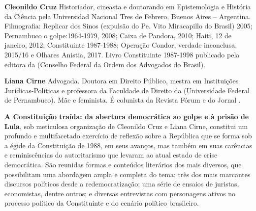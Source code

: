 \textbf{Cleonildo Cruz} Historiador, cineasta e doutorando em Epistemologia e História da Ciência pela Universidad Nacional Tres de Febrero, Buenos Aires – Argentina. Filmografia: Replicar dos Sinos (expulsão do Pe. Vito Miracapillo do Brasil) 2005; Pernambuco o golpe:1964-1979, 2008; Caixa de Pandora, 2010; Haiti, 12 de janeiro, 2012; Constituinte 1987-1988; Operação Condor, verdade inconclusa, 2015/16 e Olhares Anistia, 2017. Livro Constituinte 1987-1998 publicado pela editora da  (Conselho Federal da Ordem dos Advogados do Brasil).

\textbf{Liana Cirne} Advogada. Doutora em Direito Público, mestra em Instituições Jurídicas-Políticas e professora da Faculdade de Direito da  (Universidade Federal de Pernambuco). Mãe e feminista. É colunista da Revista Fórum e do Jornal . 

\textbf{A Constituição traída: da abertura democrática ao golpe e à prisão
de Lula}, sob meticulosa organização de Cleonildo Cruz e Liana Cirne, constitui
um profundo e multifacetado exercício de reflexão sobre a República que se forma
sob a égide da Constituição de 1988, em seus avanços, mas também em suas carências
e reminiscências do autoritarismo que levaram ao atual estado de crise democrática.
São reunidas formas e conteúdos literários dos mais diversos, que possibilitam
uma abordagem ampla e completa do tema: três dos mais marcantes discursos políticos
desde a redemocratização; uma série de ensaios de juristas, economistas, dentre
outros; e diversas entrevistas com personagens ativos no processo político da
Constituinte e do cenário político brasileiro.